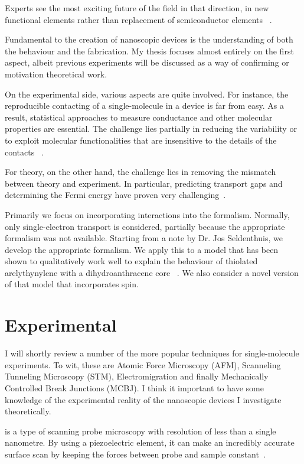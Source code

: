 Experts see the most exciting future of the field in that direction, in new functional elements rather than replacement of semiconductor elements ~\cite{visions}.

Fundamental to the creation of nanoscopic devices is the understanding of both the behaviour and the fabrication. My thesis focuses almost entirely on the first aspect, albeit previous experiments will be discussed as a way of confirming or motivation theoretical work.

On the experimental side, various aspects are quite involved. For instance, the reproducible contacting of a single-molecule in a device is far from easy. As a result, statistical approaches to measure conductance and other molecular properties are essential. The challenge lies partially in reducing the variability or to exploit molecular functionalities that are insensitive to the details of the contacts ~\cite{visions}.

For theory, on the other hand, the challenge lies in removing the mismatch between theory and experiment. In particular, predicting transport gaps and determining the Fermi energy have proven very challenging~\cite{perrin}. 

Primarily we focus on incorporating interactions into the formalism. Normally, only single-electron transport is considered, partially because the appropriate formalism  was not available. Starting from a note by Dr. Jos Seldenthuis, we develop the appropriate formalism. We apply this to a model that has been shown to qualitatively work well to explain the behaviour of thiolated arelythynylene with a dihydroanthracene core ~\cite{perrinnano}. We also consider a novel version of that model that incorporates spin. 
\section{Experimental}
I will shortly review a number of the more popular techniques for single-molecule experiments. To wit, these are Atomic Force Microscopy (AFM), Scanneling Tunneling Microscopy (STM), Electromigration and finally Mechanically Controlled Break Junctions (MCBJ). I think it important to have some knowledge of the experimental reality of the nanoscopic devices I investigate theoretically.

 is a type of scanning probe microscopy with resolution of less than a single nanometre. By using a piezoelectric element, it can make an incredibly accurate surface scan by keeping the forces between probe and sample constant~\cite{frei1, frei2}.

